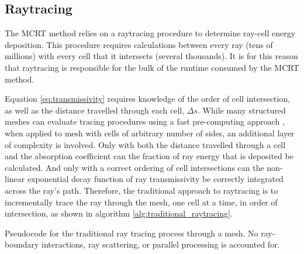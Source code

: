 \subsection{Raytracing}
The MCRT method relies on a raytracing procedure to determine ray-cell energy deposition. This procedure requires calculations between every ray (tens of millions) with every cell that it intersects (several thousands). 
It is for this reason that raytracing is responsible for the bulk of the runtime consumed by the MCRT method.

Equation \ref{eq:transmissivity} requires knowledge of the order of cell intersection, as well as the distance travelled through each cell, $\Delta{}s$. While many structured meshes can evaluate tracing procedures using a fast pre-computing approach \cite{Amanatides1987ATracing}, when applied to mesh with cells of arbitrary number of sides, an additional layer of complexity is involved.
Only with both the distance travelled through a cell and the absorption coefficient can the fraction of ray energy that is deposited be calculated.
And only with a correct ordering of cell intersections can the non-linear exponential decay function of ray transmissivity be correctly integrated across the ray's path.
Therefore, the traditional approach to raytracing is to incrementally trace the ray through the mesh, one cell at a time, in order of intersection, as shown in algorithm  \ref{alg:traditional_raytracing}.

\begin{algorithm}[hbt!]
\caption{Pseudocode for the traditional ray tracing process through a mesh. No ray-boundary interactions, ray scattering, or parallel processing is accounted for.}\label{alg:traditional_raytracing}
\end{algorithm}

